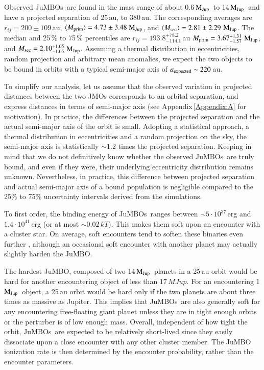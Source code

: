 \documentclass[submission,phys]{lib/SciPost}
\newcommand{\MJup}{\mbox{$\mathrm{{M}}_{\rm Jup}$}}
\newcommand{\jumbo}{\mbox{JuMBO}}
\newcommand{\jumbos}{\mbox{JuMBOs}}
\begin{document}
Observed \jumbos\ are found in the mass range of about 0.6\,\MJup\, to
14\,\MJup\, and have a projected separation of 25\,au, to $380$\,au.
The corresponding averages are $r_{ij}=200\pm109$\,au, $\langle M_{\rm
  prim}\rangle = 4.73\pm3.48$\,\MJup, and $\langle M_{\rm sec}\rangle
= 2.81\pm2.29$\,\MJup. The median and 25\,\% to 75\,\% percentiles are
$r_{ij} = 193.8^{+78.2}_{-114.1}$\,au $M_{\rm prim} =
3.67^{+1.31}_{-1.57}$\,\MJup, and $M_{\rm sec} = 2.10^{+1.05}_{-1.05}$\,\MJup.
Assuming a thermal distribution in eccentricities, random projection
and arbitrary mean anomalies, we expect the two objects to be bound in
orbits with a typical semi-major axis of $a_{\rm expected} \sim
220$\,au.

To simplify our analysis, let us assume that the observed variation in
projected distances between the two JMOs corresponds to an orbital
separation, and express distances in terms of semi-major axis (see
Appendix\,\ref{Appendix:A} for motivation).  In practice, the
differences between the projected separation and the actual semi-major
axis of the orbit is small. Adopting a statistical approach, a thermal
distribution in eccentricities and a random projection on the sky, the
semi-major axis is statistically $\sim 1.2$ times the projected
separation. Keeping in mind that we do not definitively know whether
the observed \jumbos\, are truly bound, and even if they were, their
underlying eccentricity distribution remains unknown. Nevertheless, in
practice, this difference between projected separation and actual
semi-major axis of a bound population is negligible compared to the
25\% to 75\% uncertainty intervals derived from the simulations.

To first order, the binding energy of \jumbos\ ranges between $\sim
5\cdot 10^{37}$\,erg and $1.4\cdot 10^{41}$\,erg (or at most $\sim
0.02$\,$kT$). This makes them soft upon an encounter with a cluster star. 
On average, soft encounters tend to soften these binaries even further
\cite{1975MNRAS.173..729H}, although an occasional soft encounter with
another planet may actually slightly harden the \jumbo. 

The hardest \jumbo, composed of two 14\,\MJup\, planets in a 25\,au
orbit would be hard for another encountering object of less than
$17\,MJup$.  For an encountering 1\,\MJup\, object, a 25\,au
orbit would be hard only if the two planets are about three times as
massive as Jupiter.  This implies that \jumbos\, are also generally soft for
any encountering free-floating giant planet unless they are in tight
enough orbits or the perturber is of low enough mass. Overall, independent
of how tight the orbit, \jumbos\, are expected to be relatively short-lived
since they easily dissociate upon a close encounter with any
other cluster member.  The \jumbo\, ionization rate is then determined
by the encounter probability, rather than the encounter parameters.
\end{document}
